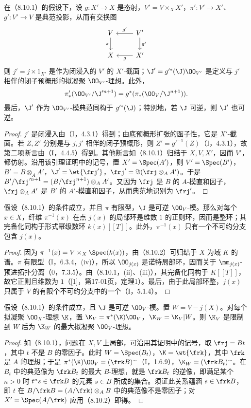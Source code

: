  在（8.10.1）的假设下，设 $g:X'\to X$ 是态射，$V'=V\times_X X'$，$\pi':V'\to X'$、$g':V'\to V$ 是典范投影，从而有交换图
\[\begin{tikzcd}V\arrow[d,"\pi"']&V'\arrow[l,"g'"']\arrow[d,"\pi'"]\\X&X'\arrow[l,"g"]\end{tikzcd}\]
则 $j'=j\times1_{X'}$ 是作为闭浸入的 $V'$ 的 $X'$-截面；$\J'=g'^*(\J)\OO_{V'}$ 是定义与 $j'$ 相伴的闭子预概形的拟凝聚 $\OO_{V'}$-理想。此外，
\[\pi'_*(\OO_{V'}/\J'^{n+1})=g^*(\pi_*(\OO_V/\J^{n+1})).\]
最后，$\J'$ 作为 $\OO_{V'}$-模典范同构于 $g'^*(\J)$；特别地，若 $\J$ 可逆，则 $\J'$ 也可逆。
\begin{proof}
$j'$ 是闭浸入由（I，4.3.1）得到；由底预概形扩张的函子性，它是 $X'$-截面。若 $Z,Z'$ 分别是与 $j,j'$ 相伴的闭子预概形，则 $Z'=g'^{-1}(Z)$（I，4.3.1），故第二项断言由（I，4.4.5）得到。其他断言如（8.10.1）归结于 $X,V,X'$，因而 $V'$，都仿射。沿用该引理证明中的记号，置 $X'=\Spec(A')$，则 $V'=\Spec(B')$，$B'=B\otimes_A A'$，$\J'=\wt{\frj'}$，$\frj'=\Im(\frj\otimes_A A')$。于是 $B'/\frj'^{n+1}=(B/\frj^{n+1})\otimes_A A'$。又因为 $\frj$ 是 $B$ 的 $A$-模直和因子，$\frj\otimes_A A'$ 是 $B'$ 的 $A'$-模直和因子，从而典范地识别为 $\frj'$。
\end{proof}

 假设（8.10.1）的条件成立，并且 $\pi$ 有限型，$\J$ 是可逆 $\OO_V$-模。那么对每个 $x\in X$，纤维 $\pi^{-1}(x)$ 在点 $j(x)$ 的局部环是维数 $1$ 的正则环，因而是整环；其完备化同构于形式幂级数环 $k(x)[[T]]$。此外，$\pi^{-1}(x)$ 只有一个不可约分支包含 $j(x)$。
\begin{proof}
因为 $\pi^{-1}(x)=V\times_X\Spec(k(x))$，由（8.10.2）可归结于 $X$ 为域 $K$ 的谱。$\pi$ 有限型（I，6.3.4，(iv)），所以 $\OO_{j(x)}$ 是诺特局部环，因而关于 $\mm_{j(x)}$-预进拓扑分离（0，7.3.5）。由（8.10.1，(ii)、(iii)），其完备化同构于 $K[[T]]$，故它正则且维数为 $1$（[1]，第17-01页，定理1）。最后，由于此局部环整，$j(x)$ 只属于 $V$ 的有限个不可约分支中的一个（I，5.1.4）。
\end{proof}

 假设（8.10.1）的条件成立，且 $\J$ 是可逆 $\OO_V$-模。置 $W=V-j(X)$。对每个拟凝聚 $\OO_X$-理想 $\K$，置 $\K_V=\pi^*(\K)\OO_V$，$\K_W=\K_V|W$。则 $\K_V$ 是限制到 $W$ 后为 $\K_W$ 的最大拟凝聚 $\OO_V$-理想。
\begin{proof}
如（8.10.1），问题在 $X,V$ 上局部，可沿用其证明中的记号，取 $\frj=Bt$，其中 $t$ 不是 $B$ 的零因子。此时 $W=\Spec(B_t)$，$\K=\wt{\frk}$，其中 $\frk$ 是 $A$ 的理想；于是 $\pi^*(\K)\OO_V=(\frk B)^{\sim}$（I，1.6.9），$\K_W=(\frk B_t)^{\sim}$。在 $B_t$ 中的典范像为 $\frk B_t$ 的最大 $B$-理想，就是 $\frk B_t$ 的逆像，即满足某个 $n>0$ 时 $t^ns\in\frk B$ 的元素 $s\in B$ 所成的集合。须证此关系蕴涵 $s\in\frk B$，即 $t$ 在 $B/\frk B=(A/\frk)\otimes_A B$ 中的典范像不是零因子；对 $X'=\Spec(A/\frk)$ 应用（8.10.2）即得。
\end{proof}

